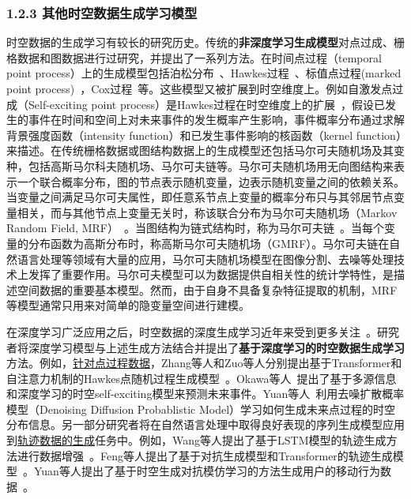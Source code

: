 \documentclass[12pt,UTF8,AutoFakeBold=2,a4paper]{ctexart} %
\begin{document}
\subsubsection{1.2.3 其他时空数据生成学习模型}
时空数据的生成学习有较长的研究历史。传统的\textbf{非深度学习生成模型}对点过成、栅格数据和图数据进行过研究，并提出了一系列方法。在时间点过程（temporal point process）上的生成模型包括泊松分布~\cite{pasupathy2010generating}、Hawkes过程~\cite{gonzalez2016spatio}、标值点过程(marked point process)~\cite{cressie2015statistics}，Cox过程~\cite{brix2001spatiotemporal}等。这些模型又被扩展到时空维度上。例如自激发点过成（Self-exciting point process）是Hawkes过程在时空维度上的扩展~\cite{mohler2011self}，假设已发生的事件在时间和空间上对未来事件的发生概率产生影响，事件概率分布通过求解背景强度函数（intensity function）和已发生事件影响的核函数（kernel function）来描述。在传统栅格数据或图结构数据上的生成模型还包括马尔可夫随机场及其变种，包括高斯马尔科夫随机场、马尔可夫链等。马尔可夫随机场用无向图结构来表示一个联合概率分布，图的节点表示随机变量，边表示随机变量之间的依赖关系。当变量之间满足马尔可夫属性，即任意系节点上变量的概率分布只与其邻居节点变量相关，而与其他节点上变量无关时，称该联合分布为马尔可夫随机场（Markov Random Field, MRF）~\cite{li1994markov}。当图结构为链式结构时，称为马尔可夫链~\cite{ching2006markov}。当每个变量的分布函数为高斯分布时，称高斯马尔可夫随机场（GMRF）。马尔可夫链在自然语言处理等领域有大量的应用，马尔可夫随机场模型在图像分割、去噪等处理技术上发挥了重要作用。马尔可夫模型可以为数据提供自相关性的统计学特性，是描述空间数据的重要基本模型。然而，由于自身不具备复杂特征提取的机制，MRF等模型通常只用来对简单的隐变量空间进行建模。

在深度学习广泛应用之后，时空数据的深度生成学习近年来受到更多关注~\cite{gao2022generative}。研究者将深度学习模型与上述生成方法结合并提出了\textbf{基于深度学习的时空数据生成学习}方法。例如，\underline{针对点过程数据}，Zhang等人和Zuo等人分别提出基于Transformer和自注意力机制的Hawkes点随机过程生成模型~\cite{zuo2020transformer,zhang2020self}。Okawa等人~\cite{okawa2019deep}提出了基于多源信息和深度学习的时空self-exciting模型来预测未来事件。Yuan等人~\cite{yuan2023spatio}利用去噪扩散概率模型（Denoising Diffusion Probablistic Model）学习如何生成未来点过程的时空分布信息。另一部分研究者将在自然语言处理中取得良好表现的序列生成模型应用到\underline{轨迹数据的生成}任务中。例如，Wang等人提出了基于LSTM模型的轨迹生成方法进行数据增强~\cite{wang2022deep}。Feng等人提出了基于对抗生成模型和Transformer的轨迹生成模型~\cite{feng2020learning}。Yuan等人提出了基于时空生成对抗模仿学习的方法生成用户的移动行为数据~\cite{yuan2022activity}。
\end{document}
